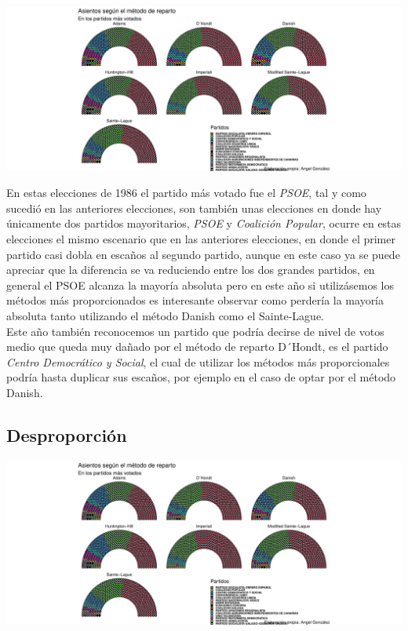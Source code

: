 \documentclass[12pt,a4paper,]{book}
\numberwithin{dummy}{section}
\theoremstyle{ocrenumbox}
\theoremstyle{blacknumex}
\theoremstyle{blacknumbox}
\theoremstyle{ocrenum}
\theoremstyle{ocrenum}
\begin{document}
\begin{center}\includegraphics[width=1\linewidth]{figurasR/unnamed-chunk-87-1} \end{center}

En estas elecciones de 1986 el partido más votado fue el \emph{PSOE},
tal y como sucedió en las anteriores elecciones, son también unas
elecciones en donde hay únicamente dos partidos mayoritarios,
\emph{PSOE} y \emph{Coalición Popular}, ocurre en estas elecciones el
mismo escenario que en las anteriores elecciones, en donde el primer
partido casi dobla en escaños al segundo partido, aunque en este caso ya
se puede apreciar que la diferencia se va reduciendo entre los dos
grandes partidos, en general el PSOE alcanza la mayoría absoluta pero en
este año si utilizásemos los métodos más proporcionados es interesante
observar como perdería la mayoría absoluta tanto utilizando el método
Danish como el Sainte-Lague.\\
Este año también reconocemos un partido que podría decirse de nivel de
votos medio que queda muy dañado por el método de reparto D´Hondt, es el
partido \emph{Centro Democrático y Social}, el cual de utilizar los
métodos más proporcionales podría hasta duplicar sus escaños, por
ejemplo en el caso de optar por el método Danish.

\hypertarget{desproporciuxf3n-3}{%
\subsection{Desproporción}\label{desproporciuxf3n-3}}

\begin{center}\includegraphics[width=1\linewidth]{figurasR/unnamed-chunk-88-1} \end{center}
\end{document}
